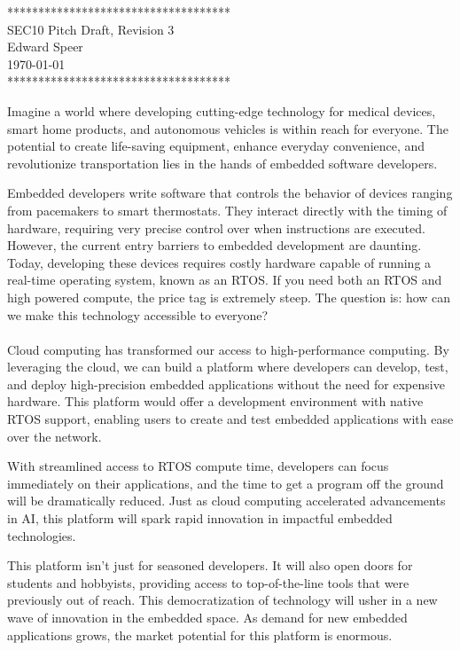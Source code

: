 \documentclass{article}
\newcommand{\HWNUM}{3}
\begin{document}

    \begin{center}
        ************************************ \\
        SEC10 Pitch Draft, Revision \HWNUM \\
        Edward Speer \\
        \today \\
        ************************************
    \end{center}

Imagine a world where developing cutting-edge technology for medical
devices, smart home products, and autonomous vehicles is within reach for
everyone. The potential to create life-saving equipment, enhance everyday
convenience, and revolutionize transportation lies in the hands of embedded
software developers.

Embedded developers write software that controls the behavior of devices 
ranging from pacemakers to smart thermostats. They interact directly with 
the timing of hardware, requiring very precise control over when instructions
are executed. However, the current entry barriers to embedded development are
daunting. Today, developing these devices requires costly hardware capable
of running a real-time operating system, known as an RTOS. If you need both an
RTOS and high powered compute, the price tag is extremely steep. The question
is: how can we make this technology accessible to everyone? \\ \hfill \\

Cloud computing has transformed our access to high-performance computing. By
leveraging the cloud, we can build a platform where developers can develop,
test, and deploy high-precision embedded applications without the need for
expensive hardware. This platform would offer a development environment with
native RTOS support, enabling users to create and test embedded applications
with ease over the network.

With streamlined access to RTOS compute time, developers can focus immediately
on their applications, and the time to get a program off the ground will be 
dramatically reduced. Just as cloud computing accelerated advancements in AI,
this platform will spark rapid innovation in impactful embedded technologies.

This platform isn't just for seasoned developers. It will also open doors for
students and hobbyists, providing access to top-of-the-line tools that were
previously out of reach. This democratization of technology will usher in a
new wave of innovation in the embedded space. As demand for new embedded
applications grows, the market potential for this platform is enormous.
\end{document}
